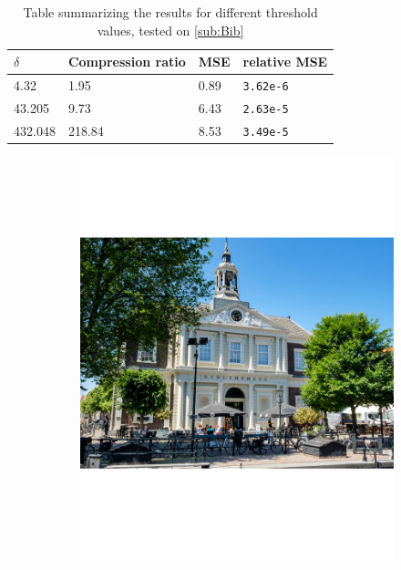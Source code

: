 \documentclass[a4paper]{article}
\begin{document}
\begin{table}[H]
	\centering
	\begin{tabular}{|l|l|l|l|}
	\hline
	$\delta$	& Compression ratio & MSE & relative MSE \\ \hline
	4.32	& 1.95 & 0.89 & \texttt{3.62e-6} \\ \hline
	43.205	& 9.73 & 6.43 & \texttt{2.63e-5} \\ \hline
	432.048	& 218.84 & 8.53 & \texttt{3.49e-5} \\ \hline
	\end{tabular}
	\caption{Table summarizing the results for different threshold values, tested on \cref{sub:Bib}}
	\label{tab:bib}
\end{table}

\begin{figure}[H]
	\centering
	\begin{subfigure}{0.49\textwidth}
		\centering
		\includegraphics[trim={4cm 8cm 4cm 8cm},clip,width=1\textwidth]{Images/Bib.pdf}

\end{subfigure}
\end{figure}
\end{document}
